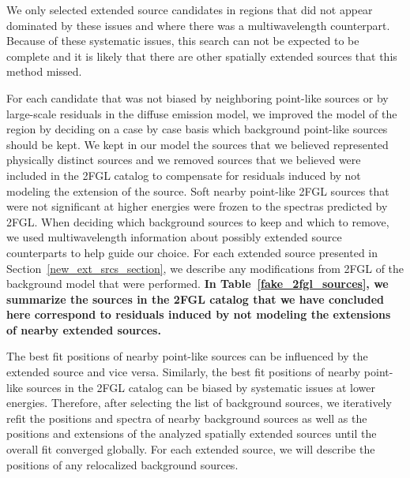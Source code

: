 \documentclass[12pt,preprint]{aastex}
\newcommand{\newtext}[1]{{\bfseries \color{red}#1}}
\begin{document}
We only selected extended source
candidates in regions that did not appear dominated by these issues and
where there was a multiwavelength
counterpart. Because of these systematic issues, this search can not be
expected to be complete and it is likely that there are other spatially
extended sources that this method missed.

For each candidate that was not biased by neighboring point-like
sources or by large-scale residuals in the diffuse emission model, we
improved the model of the region by deciding on a case by case basis which
background point-like sources should be kept.  We kept in our model the
sources that we
believed represented physically distinct sources and we removed 
sources that we believed were included in the 2FGL catalog to compensate
for residuals induced by not modeling the extension of the source.
Soft nearby point-like 2FGL sources that were not significant at higher energies
were frozen to the spectras predicted by 2FGL.
When deciding
which background sources to keep and which to remove, we used 
multiwavelength information about possibly extended source counterparts
to help guide our choice. For each extended source presented in 
Section~\ref{new_ext_srcs_section}, we describe any modifications from 2FGL
of the background model that were performed.
\newtext{In Table~\ref{fake_2fgl_sources}, we summarize the sources in
the 2FGL catalog that we have concluded here correspond to residuals
induced by not modeling the extensions of nearby extended sources.}

The best fit positions of nearby point-like sources can be influenced by
the extended source and vice versa.  Similarly,
the best fit positions of nearby point-like sources in the 2FGL catalog can be biased
by systematic issues at lower energies.
Therefore, after selecting the list of background sources, we iteratively
refit the positions and spectra of nearby background sources as well as
the positions and extensions of the analyzed spatially extended
sources until the overall fit converged globally.  For each extended
source, we will describe the positions of any relocalized background
sources.
\end{document}
